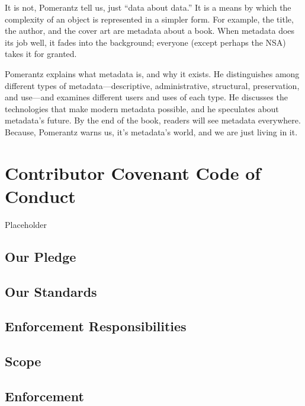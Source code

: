 \documentclass[
  fontsize=13pt,
  english,
  a4paper,
  openany, a4paper, oneside]{book}
\begin{document}
It is not, Pomerantz tell us, just ``data about data.'' It is a means by which the complexity of an object is represented in a simpler form. For example, the title, the author, and the cover art are metadata about a book. When metadata does its job well, it fades into the background; everyone (except perhaps the NSA) takes it for granted.

Pomerantz explains what metadata is, and why it exists. He distinguishes among different types of metadata---descriptive, administrative, structural, preservation, and use---and examines different users and uses of each type. He discusses the technologies that make modern metadata possible, and he speculates about metadata's future. By the end of the book, readers will see metadata everywhere. Because, Pomerantz warns us, it's metadata's world, and we are just living in it.

\hypertarget{covenant}{%
\chapter{Contributor Covenant Code of Conduct}\label{covenant}}

Placeholder

\hypertarget{our-pledge}{%
\section{Our Pledge}\label{our-pledge}}

\hypertarget{our-standards}{%
\section{Our Standards}\label{our-standards}}

\hypertarget{enforcement-responsibilities}{%
\section{Enforcement Responsibilities}\label{enforcement-responsibilities}}

\hypertarget{scope}{%
\section{Scope}\label{scope}}

\hypertarget{enforcement}{%
\section{Enforcement}\label{enforcement}}
\end{document}
